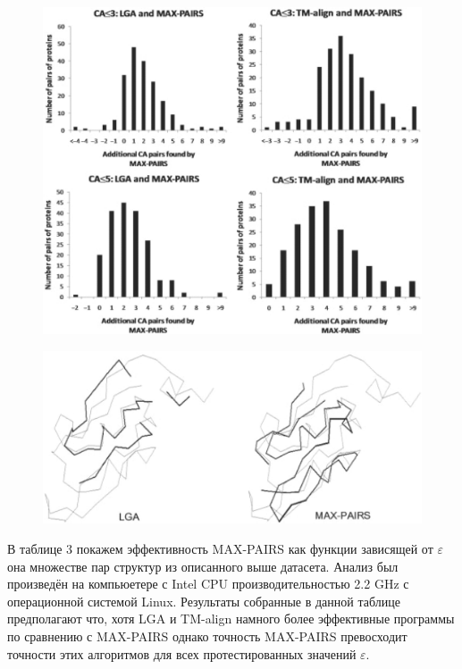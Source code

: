 \documentclass[a4paper]{extreport}
\newcommand{\eps}{\varepsilon}
\begin{document}
\begin{figure}
\caption{}
\includegraphics[scale=0.27]{../pictures/btp530f3.jpeg}
\end{figure}

\begin{figure}
\caption{}
\includegraphics[scale=0.27]{../pictures/btp530f4.jpeg}
\end{figure}

В таблице 3 покажем эффективность MAX-PAIRS как функции зависящей от $\eps$ она множестве пар структур из описанного выше датасета. Анализ был произведён на компьюетере с Intel CPU производительностью 2.2 GHz с операционной системой Linux. Результаты собранные в данной таблице предполагают что, хотя LGA и TM-align намного более эффективные программы по сравнению с MAX-PAIRS однако точность MAX-PAIRS превосходит точности этих алгоритмов для всех протестированных значений $\eps$.
\end{document}
